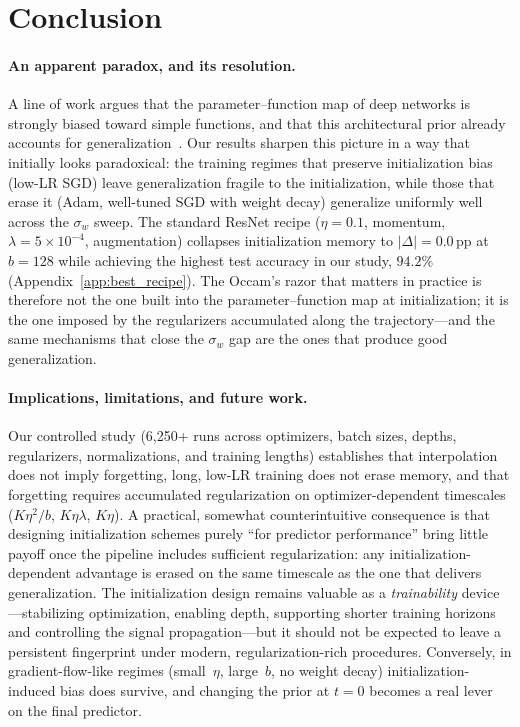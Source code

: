 \documentclass{article}
\newcommand{\sigw}{\sigma_w}
\begin{document}
\section{Conclusion}
\label{sec:conclusion}
\vspace{-0.7em}
\paragraph{An apparent paradox, and its resolution.}
A line of work argues that the parameter--function map of deep networks is
strongly biased toward simple functions, and that this architectural prior
already accounts for
generalization~\citep{valle2019deep,mingard2020neural,mingard2025occam}.
Our results sharpen this picture in a way that initially looks paradoxical:
the training regimes that preserve initialization bias (low-LR SGD) leave generalization fragile to the initialization, while those that erase it (Adam, well-tuned SGD with weight decay) generalize uniformly well across the $\sigma_w$ sweep.  The standard ResNet recipe
($\eta{=}0.1$, momentum, $\lambda{=}5\!\times\!10^{-4}$, augmentation)
collapses initialization memory to $|\Delta|{=}0.0$\,pp at $b{=}128$
while achieving the highest test accuracy in our study, $94.2\%$
(Appendix~\ref{app:best_recipe}).  The Occam's razor that matters in practice is therefore not the one built into the parameter--function map at
initialization; it is the one imposed by the regularizers accumulated along
the trajectory---and the same mechanisms that close the $\sigw$ gap are the
ones that produce good generalization.

\vspace{-0.7em}
\paragraph{Implications, limitations, and future work.}
Our controlled study (6{,}250+ runs across optimizers, batch sizes, depths,
regularizers, normalizations, and training lengths) establishes that
interpolation does not imply forgetting, long, low-LR training does not
erase memory, and that forgetting requires accumulated regularization on
optimizer-dependent timescales ($K\eta^2/b$, $K\eta\lambda$, $K\eta$).
A practical, somewhat counterintuitive consequence is that designing
initialization schemes purely ``for predictor performance'' bring little payoff once the pipeline includes sufficient regularization: any initialization-dependent advantage is erased on the same timescale as the one that delivers
generalization.  The initialization design remains valuable as a
\emph{trainability} device---stabilizing optimization, enabling depth,
supporting shorter training horizons and controlling the signal
propagation---but it should not be expected to leave a persistent fingerprint
under modern, regularization-rich procedures.  Conversely, in gradient-flow-like
regimes (small~$\eta$, large~$b$, no weight decay) initialization-induced
bias does survive, and changing the prior at $t{=}0$ becomes a real lever on
the final predictor.
\end{document}

